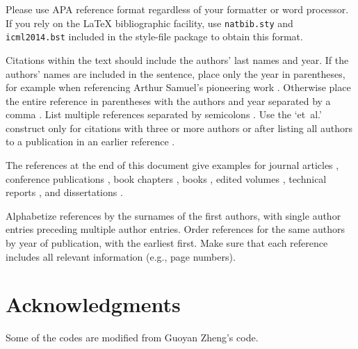 \documentclass{article}
\begin{document}
Please use APA reference format regardless of your formatter
or word processor. If you rely on the \LaTeX\/ bibliographic 
facility, use {\tt natbib.sty} and {\tt icml2014.bst} 
included in the style-file package to obtain this format.

Citations within the text should include the authors' last names and
year. If the authors' names are included in the sentence, place only
the year in parentheses, for example when referencing Arthur Samuel's
pioneering work . Otherwise place the entire
reference in parentheses with the authors and year separated by a
comma \cite{Samuel59}. List multiple references separated by
semicolons \cite{kearns89,Samuel59,mitchell80}. Use the `et~al.'
construct only for citations with three or more authors or after
listing all authors to a publication in an earlier reference \cite{MachineLearningI}.

The references at the end of this document give examples for journal
articles \cite{Samuel59}, conference publications \cite{langley00}, book chapters \cite{Newell81}, books \cite{DudaHart2nd}, edited volumes \cite{MachineLearningI}, 
technical reports \cite{mitchell80}, and dissertations \cite{kearns89}. 

Alphabetize references by the surnames of the first authors, with
single author entries preceding multiple author entries. Order
references for the same authors by year of publication, with the
earliest first. Make sure that each reference includes all relevant
information (e.g., page numbers).

\section*{Acknowledgments} 
Some of the codes are modified from Guoyan Zheng's code.



\end{document}
